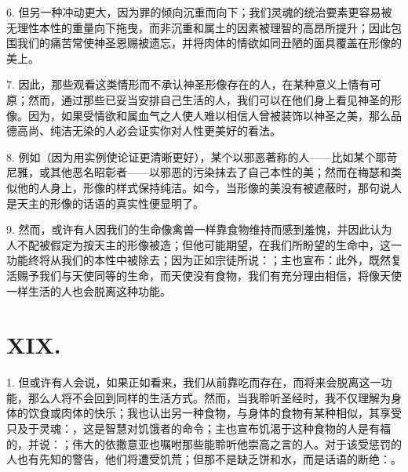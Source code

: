 6. 但另一种冲动更大，因为罪的倾向沉重而向下；我们灵魂的统治要素更容易被无理性本性的重量向下拖曳，而非沉重和属土的因素被理智的高昂所提升；因此包围我们的痛苦常使神圣恩赐被遗忘，并将肉体的情欲如同丑陋的面具覆盖在形像的美上。\par

7. 因此，那些观看这类情形而不承认神圣形像存在的人，在某种意义上情有可原；然而，通过那些已妥当安排自己生活的人，我们可以在他们身上看见神圣的形像。因为，如果受情欲和属血气之人使人难以相信人曾被装饰以神圣之美，那么品德高尚、纯洁无染的人必会证实你对人性更美好的看法。\par

8. 例如（因为用实例使论证更清晰更好），某个以邪恶著称的人——比如某个耶苛尼雅，或其他恶名昭彰者——以邪恶的污染抹去了自己本性的美；然而在梅瑟和类似他的人身上，形像的样式保持纯洁。如今，当形像的美没有被遮蔽时，那句说人是天主的形像的话语的真实性便显明了。\par

9. 然而，或许有人因我们的生命像禽兽一样靠食物维持而感到羞愧，并因此认为人不配被假定为按天主的形像被造；但他可能期望，在我们所盼望的生命中，这一功能终将从我们的本性中被除去；因为正如宗徒所说：；主也宣布：此外，既然复活赐予我们与天使同等的生命，而天使没有食物，我们有充分理由相信，将像天使一样生活的人也会脱离这种功能。\par


\section{XIX. }

1. 但或许有人会说，如果正如看来，我们从前靠吃而存在，而将来会脱离这一功能，那么人将不会回到同样的生活方式。然而，当我聆听圣经时，我不仅理解为身体的饮食或肉体的快乐；我也认出另一种食物，与身体的食物有某种相似，其享受只及于灵魂：，这是智慧对饥饿者的命令；主也宣布饥渴于这种食物的人是有福的，并说：；伟大的依撒意亚也嘱咐那些能聆听他崇高之言的人。对于该受惩罚的人也有先知的警告，他们将遭受饥荒；但那不是缺乏饼和水，而是话语的断绝：。\par


